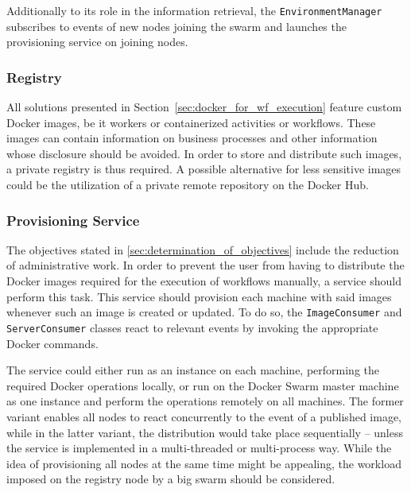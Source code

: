     Additionally to its role in the information retrieval, the \texttt{EnvironmentManager} subscribes to events of new nodes joining the swarm and launches the provisioning service on joining nodes.

  \subsubsection{Registry} %
  \label{subs:registry}
    All solutions presented in Section~\ref{sec:docker_for_wf_execution} feature custom Docker images, be it workers or containerized activities or workflows. These images can contain information on business processes and other information whose disclosure should be avoided. In order to store and distribute such images, a private registry is thus required. A possible alternative for less sensitive images could be the utilization of a private remote repository on the Docker Hub.

  \subsubsection{Provisioning Service} %
    \label{subs:provisioning_service}
    The objectives stated in \ref{sec:determination_of_objectives} include the reduction of administrative work. In order to prevent the user from having to distribute the Docker images required for the execution of workflows manually, a service should perform this task. This service should provision each machine with said images whenever such an image is created or updated. To do so, the \texttt{ImageConsumer} and \texttt{ServerConsumer} classes react to relevant events by invoking the appropriate Docker commands.

    The service could either run as an instance on each machine, performing the required Docker operations locally, or run on the Docker Swarm master machine as one instance and perform the operations remotely on all machines. The former variant enables all nodes to react concurrently to the event of a published image, while in the latter variant, the distribution would take place sequentially -- unless the service is implemented in a multi-threaded or multi-process way. While the idea of provisioning all nodes at the same time might be appealing, the workload imposed on the registry node by a big swarm should be considered.

